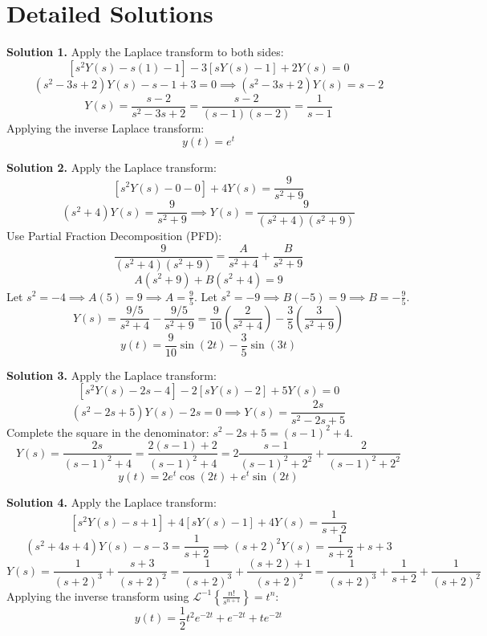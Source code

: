\documentclass[11pt, letterpaper]{article}
\theoremstyle{definition}
\theoremstyle{remark}
\begin{document}
\section{Detailed Solutions}

\textbf{Solution 1.}
Apply the Laplace transform to both sides:
\[ [s^2 Y(s) - s(1) - 1] - 3[sY(s) - 1] + 2Y(s) = 0 \]
\[ (s^2 - 3s + 2)Y(s) - s - 1 + 3 = 0 \implies (s^2 - 3s + 2)Y(s) = s - 2 \]
\[ Y(s) = \frac{s - 2}{s^2 - 3s + 2} = \frac{s - 2}{(s - 1)(s - 2)} = \frac{1}{s - 1} \]
Applying the inverse Laplace transform:
\[ y(t) = e^t \]

\vspace{1em}
\textbf{Solution 2.}
Apply the Laplace transform:
\[ [s^2 Y(s) - 0 - 0] + 4Y(s) = \frac{9}{s^2 + 9} \]
\[ (s^2 + 4)Y(s) = \frac{9}{s^2 + 9} \implies Y(s) = \frac{9}{(s^2 + 4)(s^2 + 9)} \]
Use Partial Fraction Decomposition (PFD):
\[ \frac{9}{(s^2 + 4)(s^2 + 9)} = \frac{A}{s^2 + 4} + \frac{B}{s^2 + 9} \]
\[ A(s^2 + 9) + B(s^2 + 4) = 9 \]
Let $s^2 = -4 \implies A(5) = 9 \implies A = \frac{9}{5}$. Let $s^2 = -9 \implies B(-5) = 9 \implies B = -\frac{9}{5}$.
\[ Y(s) = \frac{9/5}{s^2 + 4} - \frac{9/5}{s^2 + 9} = \frac{9}{10} \left( \frac{2}{s^2 + 4} \right) - \frac{3}{5} \left( \frac{3}{s^2 + 9} \right) \]
\[ y(t) = \frac{9}{10}\sin(2t) - \frac{3}{5}\sin(3t) \]

\vspace{1em}
\textbf{Solution 3.}
Apply the Laplace transform:
\[ [s^2 Y(s) - 2s - 4] - 2[sY(s) - 2] + 5Y(s) = 0 \]
\[ (s^2 - 2s + 5)Y(s) - 2s = 0 \implies Y(s) = \frac{2s}{s^2 - 2s + 5} \]
Complete the square in the denominator: $s^2 - 2s + 5 = (s - 1)^2 + 4$.
\[ Y(s) = \frac{2s}{(s - 1)^2 + 4} = \frac{2(s - 1) + 2}{(s - 1)^2 + 4} = 2\frac{s - 1}{(s - 1)^2 + 2^2} + \frac{2}{(s - 1)^2 + 2^2} \]
\[ y(t) = 2e^t\cos(2t) + e^t\sin(2t) \]

\vspace{1em}
\textbf{Solution 4.}
Apply the Laplace transform:
\[ [s^2 Y(s) - s + 1] + 4[sY(s) - 1] + 4Y(s) = \frac{1}{s + 2} \]
\[ (s^2 + 4s + 4)Y(s) - s - 3 = \frac{1}{s + 2} \implies (s + 2)^2 Y(s) = \frac{1}{s + 2} + s + 3 \]
\[ Y(s) = \frac{1}{(s + 2)^3} + \frac{s + 3}{(s + 2)^2} = \frac{1}{(s + 2)^3} + \frac{(s + 2) + 1}{(s + 2)^2} = \frac{1}{(s + 2)^3} + \frac{1}{s + 2} + \frac{1}{(s + 2)^2} \]
Applying the inverse transform using $\mathcal{L}^{-1}\left\{\frac{n!}{s^{n+1}}\right\} = t^n$:
\[ y(t) = \frac{1}{2}t^2 e^{-2t} + e^{-2t} + t e^{-2t} \]
\end{document}
